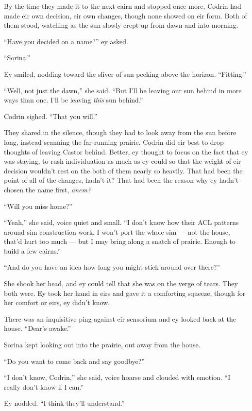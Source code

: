 By the time they made it to the next cairn and stopped once more, Codrin had made eir own decision, eir own changes, though none showed on eir form. Both of them stood, watching as the sun slowly crept up from dawn and into morning.

``Have you decided on a name?'' ey asked.

``Sorina.''

Ey smiled, nodding toward the sliver of sun peeking above the horizon. ``Fitting.''

``Well, not just the dawn,'' she said. ``But I'll be leaving our sun behind in more ways than one. I'll be leaving \emph{this} sun behind.''

Codrin sighed. ``That you will.''

They shared in the silence, though they had to look away from the sun before long, instead scanning the far-running prairie. Codrin did eir best to drop thoughts of leaving Castor behind. Better, ey thought to focus on the fact that ey was staying, to rush individuation as much as ey could so that the weight of eir decision wouldn't rest on the both of them nearly so heavily. That had been the point of all of the changes, hadn't it? That had been the reason why ey hadn't chosen the name first, \emph{anem?}

``Will you miss home?''

``Yeah,'' she said, voice quiet and small. ``I don't know how their ACL patterns around sim construction work. I won't port the whole sim — not the house, that'd hurt too much — but I may bring along a snatch of prairie. Enough to build a few cairns.''

``And do you have an idea how long you might stick around over there?''

She shook her head, and ey could tell that she was on the verge of tears. They both were. Ey took her hand in eirs and gave it a comforting squeeze, though for her comfort or eirs, ey didn't know.

There was an inquisitive ping against eir sensorium and ey looked back at the house. ``Dear's awake.''

Sorina kept looking out into the prairie, out away from the house.

``Do you want to come back and say goodbye?''

``I don't know, Codrin,'' she said, voice hoarse and clouded with emotion. ``I really don't know if I can.''

Ey nodded. ``I think they'll understand.''

